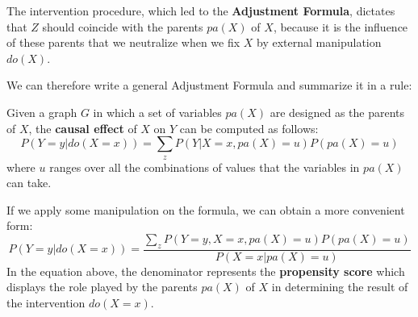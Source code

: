 The intervention procedure, which led to the \textbf{Adjustment Formula},
dictates that $Z$ should coincide with the parents $pa(X)$ of $X$, because it is
the influence of these parents that we neutralize when we fix $X$ by external
manipulation $do(X)$.

We can therefore write a general Adjustment Formula and summarize it in a rule:
\begin{definition}
      Given a graph $G$ in which a set of variables $pa(X)$ are designed as the
      parents of $X$, the \textbf{causal effect} of $X$ on $Y$ can be computed
      as follows:
      \begin{equation}
            P(Y = y| do(X = x)) = \sum_{z} P(Y | X = x, pa(X) = u)P(pa(X) = u)
      \end{equation}
      where $u$ ranges over all the combinations of values that the variables in
      $pa(X)$ can take.
\end{definition}
If we apply some manipulation on the formula, we can obtain a more convenient
form:
\begin{equation}
      P(Y = y| do(X = x)) = \frac{\sum_{z} P(Y = y, X = x, pa(X) = u)P(pa(X) = u)}{P(X = x | pa(X) = u)}
\end{equation}
In the equation above, the denominator represents the \textbf{propensity score}
which displays the role played by the parents $pa(X)$ of $X$ in determining the
result of the intervention $do(X = x)$.